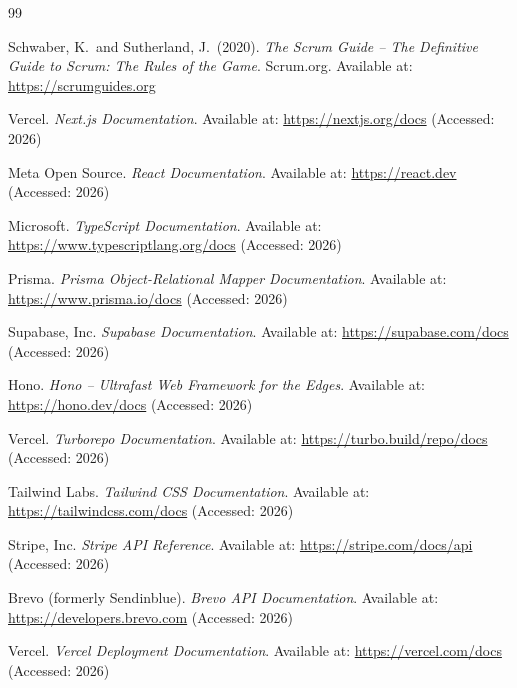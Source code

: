 \documentclass[12pt,a4paper]{report}
\begin{document}
\renewcommand{\bibname}{Reference List}
\clearpage
{}
\addcontentsline{toc}{chapter}{\bibname}

\begin{thebibliography}{99}

    Schwaber, K.\ and Sutherland, J.\ (2020).
    \textit{The Scrum Guide -- The Definitive Guide to Scrum: The Rules of the Game}.
    Scrum.org.
    Available at: \url{https://scrumguides.org}

    Vercel.
    \textit{Next.js Documentation}.
    Available at: \url{https://nextjs.org/docs}
    (Accessed: 2026)

    Meta Open Source.
    \textit{React Documentation}.
    Available at: \url{https://react.dev}
    (Accessed: 2026)

    Microsoft.
    \textit{TypeScript Documentation}.
    Available at: \url{https://www.typescriptlang.org/docs}
    (Accessed: 2026)

    Prisma.
    \textit{Prisma Object-Relational Mapper Documentation}.
    Available at: \url{https://www.prisma.io/docs}
    (Accessed: 2026)

    Supabase, Inc.
    \textit{Supabase Documentation}.
    Available at: \url{https://supabase.com/docs}
    (Accessed: 2026)

    Hono.
    \textit{Hono -- Ultrafast Web Framework for the Edges}.
    Available at: \url{https://hono.dev/docs}
    (Accessed: 2026)

    Vercel.
    \textit{Turborepo Documentation}.
    Available at: \url{https://turbo.build/repo/docs}
    (Accessed: 2026)

    Tailwind Labs.
    \textit{Tailwind CSS Documentation}.
    Available at: \url{https://tailwindcss.com/docs}
    (Accessed: 2026)

    Stripe, Inc.
    \textit{Stripe API Reference}.
    Available at: \url{https://stripe.com/docs/api}
    (Accessed: 2026)

    Brevo (formerly Sendinblue).
    \textit{Brevo API Documentation}.
    Available at: \url{https://developers.brevo.com}
    (Accessed: 2026)

    Vercel.
    \textit{Vercel Deployment Documentation}.
    Available at: \url{https://vercel.com/docs}
    (Accessed: 2026)


\end{thebibliography}
\end{document}
